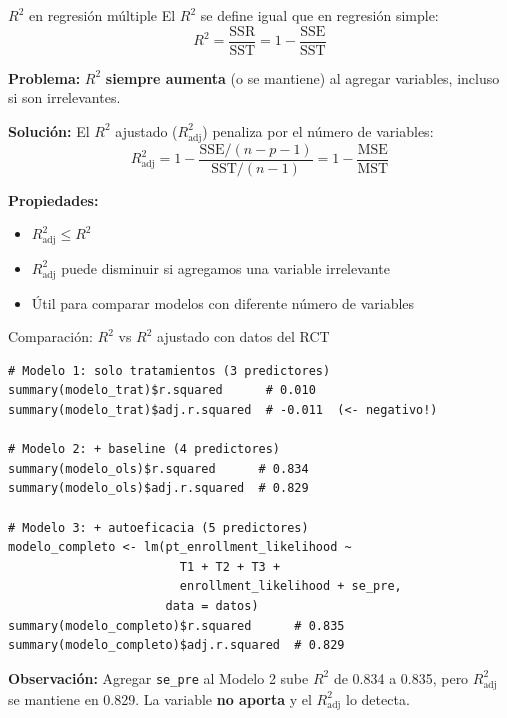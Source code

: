 \documentclass[aspectratio=169, 11pt]{beamer}
\begin{document}
\begin{frame}{$R^2$ en regresión múltiple}
El $R^2$ se define igual que en regresión simple:
\[
R^2 = \frac{\text{SSR}}{\text{SST}} = 1 - \frac{\text{SSE}}{\text{SST}}
\]

\vspace{0.2cm}
\textbf{Problema:} $R^2$ \textbf{siempre aumenta} (o se mantiene) al agregar variables, incluso si son irrelevantes.

\vspace{0.2cm}
\textbf{Solución:} El $R^2$ ajustado ($R^2_{\text{adj}}$) penaliza por el número de variables:
\[
R^2_{\text{adj}} = 1 - \frac{\text{SSE}/(n - p - 1)}{\text{SST}/(n - 1)} = 1 - \frac{\text{MSE}}{\text{MST}}
\]

\vspace{0.1cm}
\textbf{Propiedades:}
\begin{itemize}
  \item $R^2_{\text{adj}} \leq R^2$
  \item $R^2_{\text{adj}}$ puede disminuir si agregamos una variable irrelevante
  \item Útil para comparar modelos con diferente número de variables
\end{itemize}
\end{frame}

\begin{frame}[fragile]{Comparación: $R^2$ vs $R^2$ ajustado con datos del RCT}
\begin{lstlisting}[basicstyle=\ttfamily\scriptsize]
# Modelo 1: solo tratamientos (3 predictores)
summary(modelo_trat)$r.squared      # 0.010
summary(modelo_trat)$adj.r.squared  # -0.011  (<- negativo!)

# Modelo 2: + baseline (4 predictores)
summary(modelo_ols)$r.squared      # 0.834
summary(modelo_ols)$adj.r.squared  # 0.829

# Modelo 3: + autoeficacia (5 predictores)
modelo_completo <- lm(pt_enrollment_likelihood ~
                        T1 + T2 + T3 +
                        enrollment_likelihood + se_pre,
                      data = datos)
summary(modelo_completo)$r.squared      # 0.835
summary(modelo_completo)$adj.r.squared  # 0.829
\end{lstlisting}

\vspace{0.1cm}
{\small \textbf{Observación:} Agregar \texttt{se\_pre} al Modelo 2 sube $R^2$ de 0.834 a 0.835, pero $R^2_{\text{adj}}$ se mantiene en 0.829. La variable \textbf{no aporta} y el $R^2_{\text{adj}}$ lo detecta.}
\end{frame}
\end{document}
